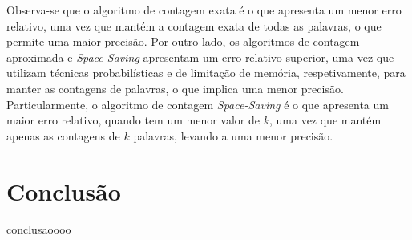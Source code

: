 \documentclass[mirror, portugues]{revdetua}
\begin{document}
Observa-se que o algoritmo de contagem exata é o que apresenta um menor erro relativo, uma vez que mantém a contagem exata de todas as palavras, o que permite uma maior precisão. Por outro lado, os algoritmos de contagem aproximada e \textit{Space-Saving} apresentam um erro relativo superior, uma vez que utilizam técnicas probabilísticas e de limitação de memória, respetivamente, para manter as contagens de palavras, o que implica uma menor precisão. Particularmente, o algoritmo de contagem \textit{Space-Saving} é o que apresenta um maior erro relativo, quando tem um menor valor de $k$, uma vez que mantém apenas as contagens de $k$ palavras, levando a uma menor precisão.

\section{Conclusão}

conclusaoooo


\end{document}
